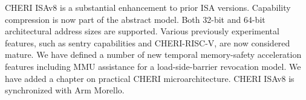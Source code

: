 CHERI ISAv8 is a substantial enhancement to prior ISA versions.
Capability compression is now part of the abstract model.
Both 32-bit and 64-bit architectural address sizes are supported.
Various previously experimental features, such as sentry capabilities and
CHERI-RISC-V, are now considered mature.
We have defined a number of new temporal memory-safety acceleration features
including MMU assistance for a load-side-barrier revocation model.
We have added a chapter on practical CHERI microarchitecture.
CHERI ISAv8 is synchronized with Arm Morello.
